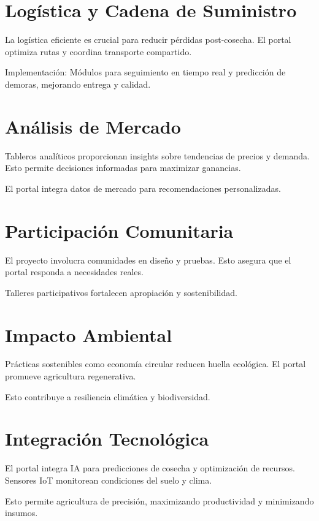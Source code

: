 \section{Logística y Cadena de Suministro}

La logística eficiente es crucial para reducir pérdidas post-cosecha. El portal optimiza rutas y coordina transporte compartido.

Implementación: Módulos para seguimiento en tiempo real y predicción de demoras, mejorando entrega y calidad.

\section{Análisis de Mercado}

Tableros analíticos proporcionan insights sobre tendencias de precios y demanda. Esto permite decisiones informadas para maximizar ganancias.

El portal integra datos de mercado para recomendaciones personalizadas.

\section{Participación Comunitaria}

El proyecto involucra comunidades en diseño y pruebas. Esto asegura que el portal responda a necesidades reales.

Talleres participativos fortalecen apropiación y sostenibilidad.

\section{Impacto Ambiental}

Prácticas sostenibles como economía circular reducen huella ecológica. El portal promueve agricultura regenerativa.

Esto contribuye a resiliencia climática y biodiversidad.

\section{Integración Tecnológica}

El portal integra IA para predicciones de cosecha y optimización de recursos. Sensores IoT monitorean condiciones del suelo y clima.

Esto permite agricultura de precisión, maximizando productividad y minimizando insumos.

